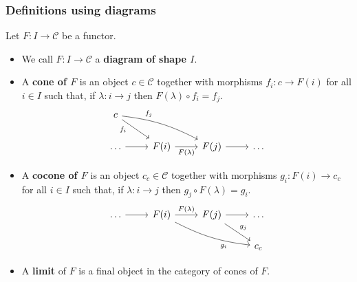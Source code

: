 \documentclass[10pt]{article}
\newcommand{\ccat}{\mathcal{C}}
\begin{document}
            \subsubsection{Definitions using diagrams}

                Let $F\colon I\to\ccat$ be a functor.

                \begin{itemize}
                    \item We call $F\colon I\to\ccat$ a \textbf{diagram of shape $I$}.
                    \item A \textbf{cone of $F$} is an object $c\in\ccat$ together with morphisms $f_i\colon c\to F(i)$ for all $i\in I$ such that, if $\lambda\colon i\to j$ then $F(\lambda)\circ f_i=f_j$.
                        \begin{equation*}
                            \begin{tikzcd}
                                c \ar{dr}[swap, near start]{f_i} \ar[bend left=10]{drr}[near start]{f_j}
                                &
                                &
                                &\\
                                \ldots \rar
                                & F(i) \rar[swap]{F(\lambda)}
                                & F(j) \rar
                                & \ldots
                            \end{tikzcd}
                        \end{equation*}
                    \item A \textbf{cocone of $F$} is an object $c_c\in\ccat$ together with morphisms $g_i\colon F(i)\to c_c$ for all $i\in I$ such that, if $\lambda\colon i\to j$ then $g_j\circ F(\lambda)=g_i$.
                        \begin{equation*}
                            \begin{tikzcd}
                                \ldots \rar
                                & F(i) \rar{F(\lambda)} \ar[bend right=10]{drr}[swap, near end]{g_i}
                                & F(j) \rar \ar{dr}{g_j}
                                & \ldots\\
                                &
                                &
                                &
                                c_c
                            \end{tikzcd}
                        \end{equation*}
                    \item A \textbf{limit} of $F$ is a final object in the category of cones of $F$.

\end{itemize}
\end{document}
